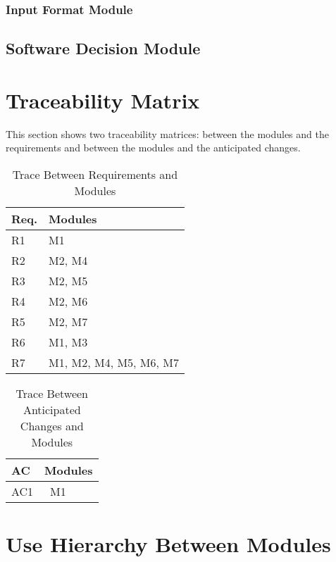 \documentclass[12pt, titlepage]{article}
\begin{document}
\subsubsection{Input Format Module}

\subsection{Software Decision Module}

\section{Traceability Matrix} \label{SecTM}

This section shows two traceability matrices: between the modules and the
requirements and between the modules and the anticipated changes.

\begin{table}[H]
\centering
\begin{tabular}{p{} p{}}
\toprule
\textbf{Req.} & \textbf{Modules}\\
\midrule
R1 & M1\\
R2 & M2, M4\\
R3 & M2, M5\\
R4 & M2, M6\\
R5 & M2, M7\\
R6 & M1, M3\\
R7 & M1, M2, M4, M5, M6, M7\\

\bottomrule
\end{tabular}
\caption{Trace Between Requirements and Modules}
\label{TblRT}
\end{table}

\begin{table}[H]
\centering
\begin{tabular}{p{} p{}}
\toprule
\textbf{AC} & \textbf{Modules}\\
\midrule
AC1 & \ M1\\
\bottomrule
\end{tabular}
\caption{Trace Between Anticipated Changes and Modules}
\label{TblACT}
\end{table}

\section{Use Hierarchy Between Modules} \label{SecUse}
\end{document}
